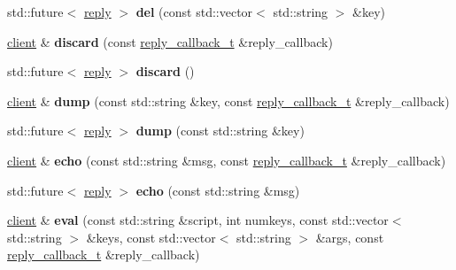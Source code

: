 \begin{DoxyCompactItemize}
std\+::future$<$ \hyperlink{classcpp__redis_1_1reply}{reply} $>$ {\bfseries del} (const std\+::vector$<$ std\+::string $>$ \&key)
\item 
\mbox{\label{classcpp__redis_1_1client_a0f5a07744750f87504f72dcf66144a24}} 
\hyperlink{classcpp__redis_1_1client}{client} \& {\bfseries discard} (const \hyperlink{classcpp__redis_1_1client_a061a1140d36d2eaeda82b09a0bb3f9f2}{reply\+\_\+callback\+\_\+t} \&reply\+\_\+callback)
\item 
\mbox{\label{classcpp__redis_1_1client_ab37e125f4f94bfa9455dc29f64698e47}} 
std\+::future$<$ \hyperlink{classcpp__redis_1_1reply}{reply} $>$ {\bfseries discard} ()
\item 
\mbox{\label{classcpp__redis_1_1client_aed6bb7657acdd4ea4dd0a4e7ec3eec20}} 
\hyperlink{classcpp__redis_1_1client}{client} \& {\bfseries dump} (const std\+::string \&key, const \hyperlink{classcpp__redis_1_1client_a061a1140d36d2eaeda82b09a0bb3f9f2}{reply\+\_\+callback\+\_\+t} \&reply\+\_\+callback)
\item 
\mbox{\label{classcpp__redis_1_1client_aa25f7f2648c1a013ce079ef13e8e2f0f}} 
std\+::future$<$ \hyperlink{classcpp__redis_1_1reply}{reply} $>$ {\bfseries dump} (const std\+::string \&key)
\item 
\mbox{\label{classcpp__redis_1_1client_a285d35a355052ae1757d13ecec0539e8}} 
\hyperlink{classcpp__redis_1_1client}{client} \& {\bfseries echo} (const std\+::string \&msg, const \hyperlink{classcpp__redis_1_1client_a061a1140d36d2eaeda82b09a0bb3f9f2}{reply\+\_\+callback\+\_\+t} \&reply\+\_\+callback)
\item 
\mbox{\label{classcpp__redis_1_1client_af0e3462a35f72aeae1527f0cb3cc8570}} 
std\+::future$<$ \hyperlink{classcpp__redis_1_1reply}{reply} $>$ {\bfseries echo} (const std\+::string \&msg)
\item 
\mbox{\label{classcpp__redis_1_1client_aeb773d0e0cacb766a0c4c7641bd91ebf}} 
\hyperlink{classcpp__redis_1_1client}{client} \& {\bfseries eval} (const std\+::string \&script, int numkeys, const std\+::vector$<$ std\+::string $>$ \&keys, const std\+::vector$<$ std\+::string $>$ \&args, const \hyperlink{classcpp__redis_1_1client_a061a1140d36d2eaeda82b09a0bb3f9f2}{reply\+\_\+callback\+\_\+t} \&reply\+\_\+callback)

\end{DoxyCompactItemize}
